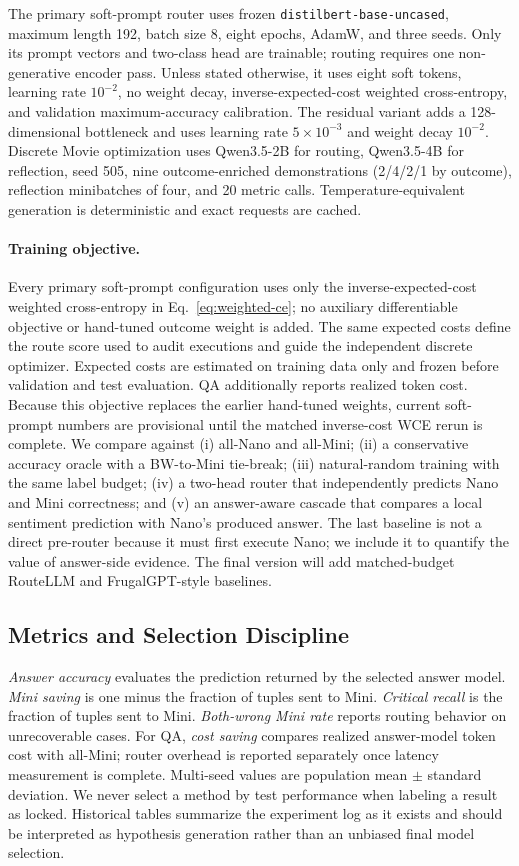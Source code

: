 The primary soft-prompt router uses frozen
\texttt{distilbert-base-}\allowbreak\texttt{uncased}, maximum length 192,
batch size 8, eight
epochs, AdamW, and three seeds. Only its prompt vectors and two-class head are
trainable; routing requires one non-generative encoder pass. Unless stated
otherwise, it uses eight soft tokens, learning rate $10^{-2}$, no weight decay,
inverse-expected-cost weighted cross-entropy, and validation maximum-accuracy calibration.
The residual variant adds a 128-dimensional bottleneck and uses learning rate
$5\times10^{-3}$ and weight decay $10^{-2}$. Discrete Movie optimization uses
Qwen3.5-2B for routing, Qwen3.5-4B for reflection, seed 505, nine outcome-enriched demonstrations
(2/4/2/1 by outcome), reflection minibatches of four, and 20 metric calls.
Temperature-equivalent generation is deterministic and exact requests are
cached.

\paragraph{Training objective.}
Every primary soft-prompt configuration uses only the inverse-expected-cost
weighted cross-entropy in Eq.~\ref{eq:weighted-ce}; no auxiliary
differentiable objective or hand-tuned outcome weight is added. The same
expected costs define the route score used to audit executions and guide the
independent discrete optimizer. Expected costs are estimated on training data only
and frozen before validation and test evaluation. QA additionally reports
realized token cost. Because this objective replaces the earlier hand-tuned
weights, current soft-prompt numbers are provisional until the matched
inverse-cost WCE rerun is complete.
We compare against (i) all-Nano and all-Mini; (ii) a conservative accuracy
oracle with a BW-to-Mini tie-break; (iii) natural-random training with the same
label budget; (iv) a two-head router that independently predicts Nano and Mini
correctness; and (v) an answer-aware cascade that compares a local sentiment prediction with
Nano's produced answer. The last baseline is not a direct pre-router because it
must first execute Nano; we include it to quantify the value of answer-side
evidence. The final version will add matched-budget RouteLLM and FrugalGPT-style
baselines.

\subsection{Metrics and Selection Discipline}

\emph{Answer accuracy} evaluates the prediction returned by the selected
answer model. \emph{Mini saving} is one minus the fraction of tuples sent to
Mini. \emph{Critical recall} is the fraction of \mo tuples sent to Mini.
\emph{Both-wrong Mini rate} reports routing behavior on unrecoverable \bw cases. For QA,
\emph{cost saving} compares realized answer-model token cost with all-Mini;
router overhead is reported separately once latency measurement is complete.
Multi-seed values are population mean $\pm$ standard deviation. We never select
a method by test performance when labeling a result as locked. Historical
tables summarize the experiment log as it exists and should be interpreted as
hypothesis generation rather than an unbiased final model selection.
